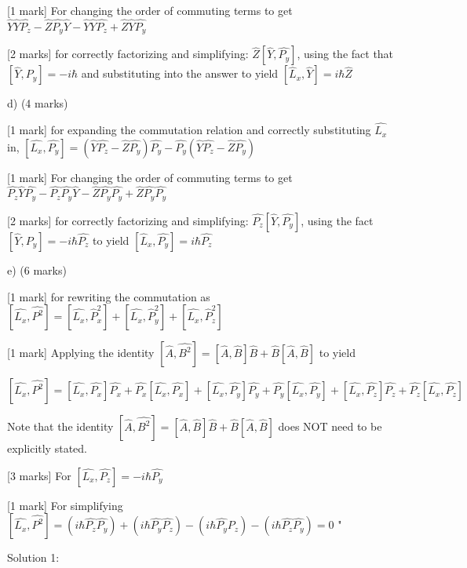 [1 mark] For changing the order of commuting terms to get \( \hat{Y}\hat{Y}\hat{P_{z}} - \hat{Z}\hat{P_{y}}\hat{Y} - \hat{Y}\hat{Y}\hat{P_{z}} + \hat{Z}\hat{Y}\hat{P_{y}} \)

[2 marks] for correctly factorizing and simplifying: \( \hat{Z}[\hat{Y}, \hat{P_{y}}] \), using the fact that \( [\hat{Y}, \hat{P_{y}}] = -i\hbar \) and substituting into the answer to yield \( [\hat{L}_x, \hat{Y}] = i\hbar \hat{Z} \)

d) (4 marks)

[1 mark] for expanding the commutation relation and correctly substituting \( \hat{L_{x}} \) in, \([\hat{L_{x}}, \hat{P_{y}}] = (\hat{Y}\hat{P_{z}} - \hat{Z}\hat{P_{y}})\hat{P_{y}} - \hat{P_{y}}(\hat{Y}\hat{P_{z}} - \hat{Z}\hat{P_{y}})\)

[1 mark] For changing the order of commuting terms to get \( \hat{P_{z}}\hat{Y}\hat{P_{y}} - \hat{P_{z}}\hat{P_{y}}\hat{Y} - \hat{Z}\hat{P_{y}}\hat{P_{y}} + \hat{Z}\hat{P_{y}}\hat{P_{y}} \)

[2 marks] for correctly factorizing and simplifying: \( \hat{P_{z}}[\hat{Y}, \hat{P_{y}}] \), using the fact \( [\hat{Y}, \hat{P_{y}}] = -i\hbar \hat{P_{z}} \) to yield \( [\hat{L}_x, \hat{P_{y}}] = i\hbar\hat{P_{z}} \)

e) (6 marks)

[1 mark] for rewriting the commutation as \( [\hat{L_{x}}, \hat{P^{2}}] = [\hat{L_{x}}, \hat{P}_{x}^{2} ] + [\hat{L_{x}}, \hat{P}_{y}^{2}] + [\hat{L_{x}}, \hat{P}_{z}^{2}] \)

[1 mark] Applying the identity \( [\hat{A}, \hat{B^{2}}] = [\hat{A}, \hat{B}]\hat{B} + \hat{B}[\hat{A},\hat{B}] \) to yield 

\[ [\hat{L_{x}}, \hat{P^{2}}] = [\hat{L_{x}}, \hat{P_{x}}]\hat{P_{x}} + \hat{P_{x}}[\hat{L_x}, \hat{P_{x}}] + [\hat{L_{x}}, \hat{P_{y}}]\hat{P_{y}} + \hat{P_{y}}[\hat{L_{x}}, \hat{P_{y}}] + [\hat{L_{x}}, \hat{P_{z}}]\hat{P_{z}} + \hat{P_{z}}[\hat{L_{x}}, \hat{P_{z}}] \]

Note that the identity \( [\hat{A}, \hat{B^{2}}] = [\hat{A}, \hat{B}]\hat{B} + \hat{B}[\hat{A},\hat{B}] \) does NOT need to be explicitly stated.

[3 marks] For \( [\hat{L_{x}}, \hat{P_{z}}] = -i\hbar\hat{P_{y}} \)

[1 mark] For simplifying \( [\hat{L_{x}}, \hat{P^{2}}] = (i\hbar\hat{P_{z}}\hat{P_{y}}) + (i\hbar\hat{P_{y}}\hat{P_{z}}) - (i\hbar\hat{P_{y}}\hat{P_{z}}) - (i\hbar\hat{P_{z}}\hat{P_{y}}) = 0 \)
"

Solution 1: 

